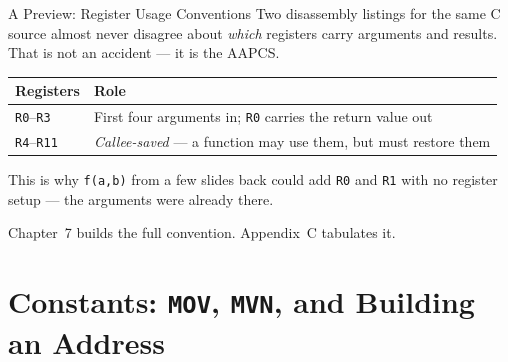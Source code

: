 \documentclass[9pt,aspectratio=169,xcolor=table]{beamer}
\begin{document}
\begin{frame}{A Preview: Register Usage Conventions}
    \leavevmode
    {\small Two disassembly listings for the same C source almost never
    disagree about \emph{which} registers carry arguments and results.
    That is not an accident --- it is the \alert{AAPCS}.}

    \vspace{2mm}
    \begin{center}
    {\small
    \striped
    \begin{tabular}{@{}l R{.6\textwidth}@{}}
        \toprule
        \textbf{Registers} & \textbf{Role} \\
        \midrule
        \texttt{R0}--\texttt{R3}  & First four arguments in; \texttt{R0} carries the return value out \\
        \texttt{R4}--\texttt{R11} & \emph{Callee-saved} --- a function may use them, but must restore them \\
        \bottomrule
    \end{tabular}}
    \end{center}

    \vspace{2mm}
    {\small This is why \texttt{f(a,b)} from a few slides back could add
    \texttt{R0} and \texttt{R1} with no register setup --- the arguments
    were already there.}

    \vspace{2mm}
    {\small Chapter~7 builds the full convention. Appendix~C tabulates it.}
\end{frame}


\section{Constants: \texttt{MOV}, \texttt{MVN}, and Building an Address}
\end{document}
